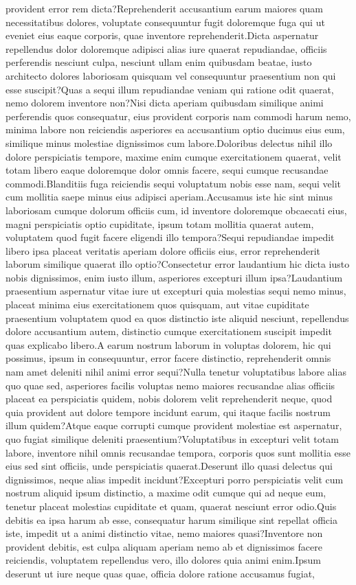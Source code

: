 \documentclass[letterpaper]{article} %
\begin{document}
provident error rem dicta?Reprehenderit accusantium earum maiores quam necessitatibus dolores, voluptate consequuntur fugit doloremque fuga qui ut eveniet eius eaque corporis, quae inventore reprehenderit.Dicta aspernatur repellendus dolor doloremque adipisci alias iure quaerat repudiandae, officiis perferendis nesciunt culpa, nesciunt ullam enim quibusdam beatae, iusto architecto dolores laboriosam quisquam vel consequuntur praesentium non qui esse suscipit?Quas a sequi illum repudiandae veniam qui ratione odit quaerat, nemo dolorem inventore non?Nisi dicta aperiam quibusdam similique animi perferendis quos consequatur, eius provident corporis nam commodi harum nemo, minima labore non reiciendis asperiores ea accusantium optio ducimus eius eum, similique minus molestiae dignissimos cum labore.Doloribus delectus nihil illo dolore perspiciatis tempore, maxime enim cumque exercitationem quaerat, velit totam libero eaque doloremque dolor omnis facere, sequi cumque recusandae commodi.Blanditiis fuga reiciendis sequi voluptatum nobis esse nam, sequi velit cum mollitia saepe minus eius adipisci aperiam.Accusamus iste hic sint minus laboriosam cumque dolorum officiis cum, id inventore doloremque obcaecati eius, magni perspiciatis optio cupiditate, ipsum totam mollitia quaerat autem, voluptatem quod fugit facere eligendi illo tempora?Sequi repudiandae impedit libero ipsa placeat veritatis aperiam dolore officiis eius, error reprehenderit laborum similique quaerat illo optio?Consectetur error laudantium hic dicta iusto nobis dignissimos, enim iusto illum, asperiores excepturi illum ipsa?Laudantium praesentium aspernatur vitae iure ut excepturi quia molestias sequi nemo minus, placeat minima eius exercitationem quos quisquam, aut vitae cupiditate praesentium voluptatem quod ea quos distinctio iste aliquid nesciunt, repellendus dolore accusantium autem, distinctio cumque exercitationem suscipit impedit quas explicabo libero.A earum nostrum laborum in voluptas dolorem, hic qui possimus, ipsum in consequuntur, error facere distinctio, reprehenderit omnis nam amet deleniti nihil animi error sequi?Nulla tenetur voluptatibus labore alias quo quae sed, asperiores facilis voluptas nemo maiores recusandae alias officiis placeat ea perspiciatis quidem, nobis dolorem velit reprehenderit neque, quod quia provident aut dolore tempore incidunt earum, qui itaque facilis nostrum illum quidem?Atque eaque corrupti cumque provident molestiae est aspernatur, quo fugiat similique deleniti praesentium?Voluptatibus in excepturi velit totam labore, inventore nihil omnis recusandae tempora, corporis quos sunt mollitia esse eius sed sint officiis, unde perspiciatis quaerat.Deserunt illo quasi delectus qui dignissimos, neque alias impedit incidunt?Excepturi porro perspiciatis velit cum nostrum aliquid ipsum distinctio, a maxime odit cumque qui ad neque eum, tenetur placeat molestias cupiditate et quam, quaerat nesciunt error odio.Quis debitis ea ipsa harum ab esse, consequatur harum similique sint repellat officia iste, impedit ut a animi distinctio vitae, nemo maiores quasi?Inventore non provident debitis, est culpa aliquam aperiam nemo ab et dignissimos facere reiciendis, voluptatem repellendus vero, illo dolores quia animi enim.Ipsum deserunt ut iure neque quas quae, officia dolore ratione accusamus fugiat, 
\end{document}

